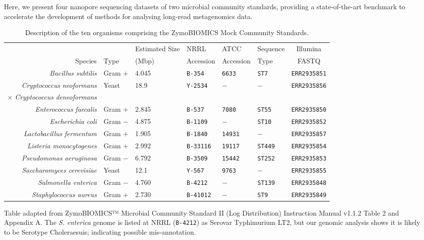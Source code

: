 \documentclass[a4paper,num-refs]{oup-contemporary}
\begin{document}
Here, we present four nanopore sequencing datasets of two microbial community standards, providing a state-of-the-art benchmark to accelerate the development of methods for analysing long-read metagenomics data.

\begin{table}[t!]
\centering
\caption{Description of the ten organisms comprising the ZymoBIOMICS Mock Community Standards.}
\label{tab:strains}
\begin{tabular}{r | l | l | l | l | l | c}
\toprule
 & & {Estimated Size} & NRRL & ATCC & Sequence & Illumina \\
 Species & Type & {(Mbp)} & Accession & Accession & Type &  FASTQ \\
\midrule
\textit{Bacillus subtilis}          & Gram $+$  & 4.045 & \texttt{B-354}   & \texttt{6633}& \texttt{ST7}   & \texttt{ERR2935851} \\
\textit{Cryptococcus neoformans}  & \multirow{2}{*}{Yeast} & \multirow{2}{*}{18.9} & \multirow{2}{*}{\texttt{Y-2534}}   & \multirow{2}{*}{$-$} & \multirow{2}{*}{$-$} & \multirow{2}{*}{\texttt{ERR2935856}} \\
$\times$ \textit{Cryptococcus deneoformans} & & & & & \\
\textit{Enterococcus faecalis}      & Gram $+$ & 2.845 & \texttt{B-537}   & \texttt{7080}& \texttt{ST55}  & \texttt{ERR2935850} \\
\textit{Escherichia coli}           & Gram $-$ & 4.875 & \texttt{B-1109}   & $-$& \texttt{ST10}  & \texttt{ERR2935852} \\
\textit{Lactobacillus fermentum}    & Gram $+$ & 1.905 & \texttt{B-1840}   & \texttt{14931}& $-$  & \texttt{ERR2935857} \\
\textit{Listeria monocytogenes}     & Gram $+$ & 2.992 & \texttt{B-33116}  & \texttt{19117}& \texttt{ST449}  & \texttt{ERR2935854} \\
\textit{Pseudomonas aeruginosa}     & Gram $-$ & 6.792 & \texttt{B-3509}   & \texttt{15442}& \texttt{ST252}  & \texttt{ERR2935853} \\
\textit{Saccharomyces cerevisiae}   & Yeast & 12.1 & \texttt{Y-567}    & \texttt{9763}& $-$  & \texttt{ERR2935855} \\
\textit{Salmonella enterica}        & Gram $-$ & 4.760 & \texttt{B-4212}    & $-$& \texttt{ST139} & \texttt{ERR2935848} \\
\textit{Staphylococcus aureus}      & Gram $+$ & 2.730 & \texttt{B-41012}  & $-$& \texttt{ST9}  & \texttt{ERR2935849} \\
\bottomrule
\end{tabular}
\begin{tablenotes}
\item Table adapted from ZymoBIOMICS™ Microbial Community Standard II (Log Distribution) Instruction Manual v1.1.2 Table 2 and Appendix A.
The \textit{S. enterica} genome is listed at NRRL (\texttt{B-4212}) as Serovar Typhimurium LT2, but our genomic analysis shows it is likely to be Serotype Choleraesuis; indicating possible mis-annotation.
\end{tablenotes}
\end{table}
\end{document}
